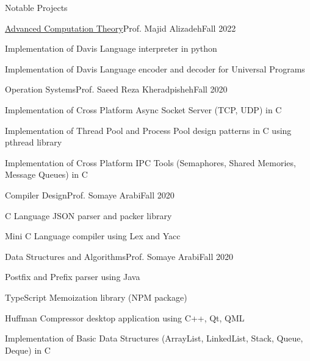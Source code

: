 \documentclass[]{main}
\begin{document}
\begin{section}{Notable Projects}
 \begin{subsection}{\href{https://github.com/ckoliber/actexercises}{Advanced Computation Theory}}{Prof. Majid Alizadeh}{Fall 2022}{}
     \item Implementation of Davis Language interpreter in python \;\href{https://github.com/ckoliber/actexercises/blob/master/projects/interpreter.py}{\faExternalLink*}
     \item Implementation of Davis Language encoder and decoder for Universal Programs \;\href{https://github.com/ckoliber/actexercises/blob/master/projects/encoder.py}{\faExternalLink*}
 \end{subsection}

 \begin{subsection}{Operation Systems}{Prof. Saeed Reza Kheradpisheh}{Fall 2020}{}
     \item Implementation of Cross Platform Async Socket Server (TCP, UDP) in C \;\href{https://github.com/ckoliber/Knet}{\faExternalLink*}
     \item Implementation of Thread Pool and Process Pool design patterns in C using pthread library \;\href{https://github.com/ckoliber/Kprocessor}{\faExternalLink*}
     \item Implementation of Cross Platform IPC Tools (Semaphores, Shared Memories, Message Queues) in C \;\href{https://github.com/ckoliber/Kipc}{\faExternalLink*}
 \end{subsection}

 \begin{subsection}{Compiler Design}{Prof. Somaye Arabi}{Fall 2020}{}
     \item C Language JSON parser and packer library \;\href{https://github.com/ckoliber/Kson}{\faExternalLink*}
     \item Mini C Language compiler using Lex and Yacc \;\href{https://github.com/ckoliber/minicc}{\faExternalLink*}
 \end{subsection}

 \begin{subsection}{Data Structures and Algorithms}{Prof. Somaye Arabi}{Fall 2020}{}
     \item Postfix and Prefix parser using Java \;\href{https://github.com/ckoliber/XFixToYFix}{\faExternalLink*}
     \item TypeScript Memoization library (NPM package) \;\href{https://github.com/ckoliber/memoizor}{\faExternalLink*}
     \item Huffman Compressor desktop application using C++, Qt, QML \;\href{https://github.com/ckoliber/kuffman}{\faExternalLink*}
     \item Implementation of Basic Data Structures (ArrayList, LinkedList, Stack, Queue, Deque) in C \;\href{https://github.com/ckoliber/kstd}{\faExternalLink*}
 \end{subsection}


\end{section}
\end{document}
